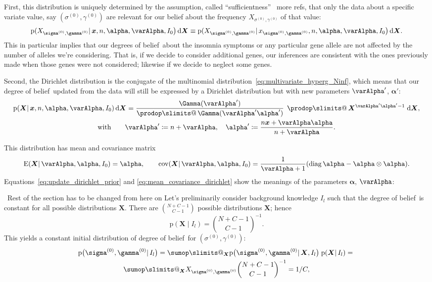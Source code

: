 \documentclass[\ifafour a4paper,12pt,\else a5paper,10pt,\fi%
onecolumn,oneside,article,%
british%
]{memoir}
\makeatletter
\theoremstyle{remark}
\theoremstyle{innote}
\def\sum{\DOTSI\sumop\slimits@}
\def\prod{\DOTSI\prodop\slimits@}
\newcommand*{\citep}{\parencites}
\newcommand*{\di}{\mathrm{d}}%
\newcommand*{\defd}{\coloneqq}
\newcommand*{\pf}{\mathrm{p}}%
\renewcommand*{\|}{\mathpunct{|}}
\newcommand*{\tprod}{\mathop{\textstyle\prod}\nolimits}
\newcommand*{\E}{\mathrm{E}}
\newcommand*{\puzzle}{\maltese}
\newcommand{\mynote}[1]{ {\color{notecolour}\puzzle\ #1}}
\DeclareMathOperator{\cov}{cov}
\DeclareMathOperator{\diag}{diag}
\newcommand*{\dob}{degree of belief}
\newcommand*{\dobs}{degrees of belief}
\newcommand*{\yprod}{\tprod}
\newcommand*{\ys}{\sigma}
\newcommand*{\yg}{\gamma}
\newcommand*{\gn}{l}
\newcommand*{\ysi}[1]{\ys^{(#1)}}
\newcommand*{\ygi}[1]{\yg^{(#1)}}
\newcommand*{\yso}{\ysi{0}}
\newcommand*{\ygo}{\ygi{0}}
\newcommand*{\yF}{\bm{X}}
\newcommand*{\yf}{\bm{x}}
\newcommand*{\yIc}{I_{\gn}}
\newcommand*{\yIo}{I_{0}}
\newcommand*{\yA}{\varAlpha}
\newcommand*{\ya}{\bm{\alpha}}
\makeatother
\begin{document}
First, this distribution
is uniquely determined by the assumption, called \enquote{sufficientness}
\citep{zabell1982,dinizetal2016}\mynote{more refs}, that only the data
about a specific variate value, say $(\yso, \ygo)$ are relevant for our
belief about the frequency $X_{\yso, \ygo}$ of that value:
\begin{equation}
  \label{eq:sufficientness}
  \pf(X_{\yso, \ygo} \| \yf, n, \ya, \yA,\yIo\bigr)\,\di\yF \equiv
  \pf(X_{\yso, \ygo} \| x_{\yso,\ygo}, n, \ya, \yA,\yIo\bigr)\,\di\yF.
\end{equation}
This in particular implies that our \dobs\ about the insomnia symptoms or
any particular gene allele are not affected by the number of alleles we're
considering. That is, if we decide to consider additional genes, our
inferences are consistent with the ones previously made when those genes
were not considered; likewise if we decide to neglect some genes.

Second, the Dirichlet distribution is the conjugate of the multinomial
distribution~\eqref{eq:multivariate_hyperg_Ninf}, which means that our
\dob\ updated from the data will still be expressed by a Dirichlet
distribution but with new parameters $\yA'$, $\ya'$:
\begin{multline}
  \label{eq:update_dirichlet_prior}
  \pf(\yF \| \yf, n, \ya, \yA,\yIo)\,\di\yF =
  \frac{\Gamma(\yA')}{\yprod\Gamma(\yA'\ya')}\;
  \yprod \yF^{\yA'\ya'-1}\;\di\yF,\\
  \text{with}\qquad
  \yA' \defd n + \yA,
  \quad
  \ya' \defd \frac{n\yf + \yA\ya}{n+\yA}.
\end{multline}

This distribution has mean and covariance matrix
\begin{equation}\label{eq:mean_covariance_dirichlet}
  \E(\yF \| \yA, \ya,\yIo) = \ya, \qquad
  \cov(\yF \| \yA, \ya,\yIo) =
  \frac{1}{\yA+1}(\diag\ya -\ya\otimes\ya).
\end{equation}
Equations~\eqref{eq:update_dirichlet_prior} and
\eqref{eq:mean_covariance_dirichlet} show the meanings of the parameters
$\ya$, $\yA$:




\mynote{Rest of the section has to be changed from here on}
Let's preliminarily consider background
knowledge $\yIc$ such that the \dob\ is constant for all possible
distributions $\yF$. There are $\binom{N+C-1}{C-1}$ possible distributions
$\yF$; hence
\begin{equation}
  \label{eq:constant_prior}
  \pf(\yF \| \yIc) = \binom{N+C-1}{C-1}^{-1}.
\end{equation}
This yields a constant  initial  distribution of \dob\ for $(\yso,\ygo)$:
\begin{multline}
  \label{eq:joint_prob_initial_F_unknown}
  \pf\bigl(\yso, \ygo \| \yIc\bigr)  =
  \sum_{\yF}  \pf\bigl(\yso, \ygo \| \yF,\yIc\bigr) \;
  \pf( \yF \| \yIc) ={}\\
  \sum_{\yF}  X_{\yso, \ygo} \binom{N+C-1}{C-1}^{-1}
  = 1/C,
\end{multline}
\end{document}
